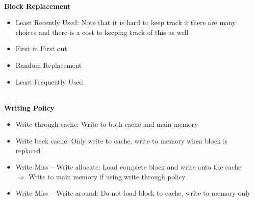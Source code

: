 \documentclass[a4paper]{article} \usepackage[backend=biber, style=numeric, sorting=none]{biblatex}
\begin{document}
\begin{multicols*}{4}
\\ \textbf{{Block Replacement}}
\begin{itemize}[leftmargin=*]
\itemsep -0.5em
\item Least Recently Used: Note that it is hard to keep track if there are many choices and there is a cost to keeping track of this as well
\item First in First out
\item Random Replacement
\item Least Frequently Used
\end{itemize}

\\ \textbf{{Writing Policy}}
\begin{itemize}[leftmargin=*]
\itemsep -0.5em
\item Write through cache: Write to both cache and main memory
\item Write back cache: Only write to cache, write to memory when block is replaced
\item Write Miss -- Write allocate: Load complete block and write onto the cache $\Rightarrow$ Write to main memory if using write through policy
\item Write Miss -- Write around: Do not load block to cache, write to memory only
\end{itemize}


\end{multicols*}
\end{document}
